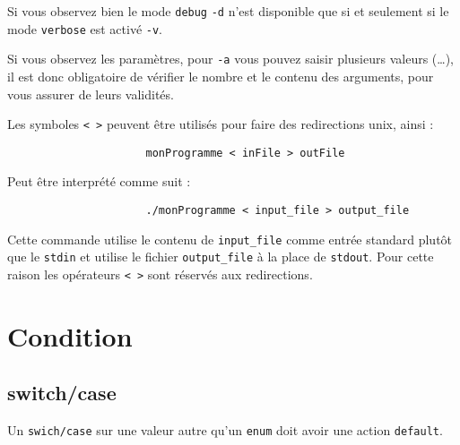 		Si vous observez bien le mode \verb+debug+ \verb+-d+ n'est disponible que si et seulement si le mode \verb+verbose+ est activé \verb+-v+.

		Si vous observez les paramètres, pour \verb+-a+ vous pouvez saisir plusieurs valeurs (\dots), il est donc obligatoire de vérifier le nombre et le contenu des arguments, pour vous assurer de leurs validités.

		Les symboles \verb+< >+ peuvent être utilisés pour faire des redirections unix, ainsi :

		\begin{figure}[H]
			\begin{changemargin}{-2.5cm}{-2.5cm}
			\begin{tcolorbox}
			\begin{verbatim}
				monProgramme < inFile > outFile
			\end{verbatim}
			\end{tcolorbox}
			\end{changemargin}
		\end{figure}

		Peut être interprété comme suit : 

		\begin{figure}[H]
			\begin{changemargin}{-2.5cm}{-2.5cm}
			\begin{tcolorbox}
			\begin{verbatim}
				./monProgramme < input_file > output_file
			\end{verbatim}
			\end{tcolorbox}
			\end{changemargin}
		\end{figure}

		Cette commande utilise le contenu de \verb+input_file+ comme entrée standard plutôt que le \verb+stdin+ et utilise le fichier \verb+output_file+ à la place de \verb+stdout+. Pour cette raison les opérateurs \verb+< >+ sont réservés aux redirections.
			
	\section{Condition}
		\subsection{switch/case}
			Un \verb+swich/case+ sur une valeur autre qu'un \verb+enum+ doit avoir une action \verb+default+.

